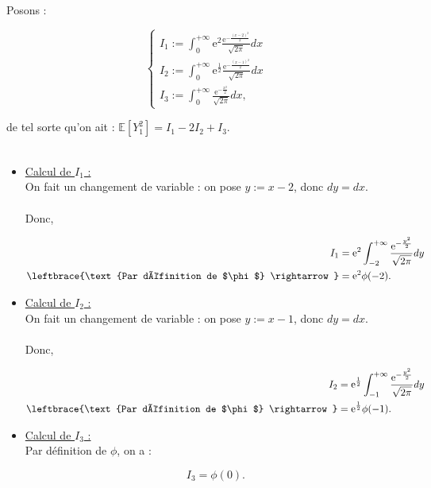 \documentclass{article}
\theoremstyle{exostyle}
\newenvironment{questions}{
\begin{enumerate}[\hspace{12pt} 1.]}{\end{enumerate}}
\begin{document}
\begin{questions}
Posons : 

\[\left\{
  \begin{array}{lll}
    I_{1} := \int_{0}^{+\infty} \text{e}^{2} \frac{ \text{e}^{-\frac{(x-2)^{2}}{2}}}{\sqrt{2\pi}}dx\\
    I_{2} := \int_{0}^{+\infty} \text{e}^{\frac{1}{2}} \frac{\text{e}^{-\frac{(x-1)^{2}}{2}}}{\sqrt{2\pi}}dx\\
    I_{3} := \int_{0}^{+\infty} \frac{\text{e}^{-\frac{x^{2}}{2}}}{\sqrt{2\pi}}dx,
\end{array}
\right.\]

de tel sorte qu'on ait : $\mathbb{E}\left[ Y_{1}^{2} \right] = I_{1}-2I_{2}+I_{3}$.\\
\\
\begin{itemize}
    \item \underline{Calcul de $I_{1}$ :}\\
    
    On fait un changement de variable : on pose $y:=x-2$, donc $dy=dx$.\\
    \\
Donc, 

\begin{align*}
    I_{1} &= \text{e}^{2} \int_{-2}^{+\infty} \frac{\text{e}^{-\frac{y^{2}}{2}}}{\sqrt{2\pi}}dy\\
    \leftbrace{\text{Par définition de $\phi$} \rightarrow} &= \text{e}^{2} \phi(-2).
\end{align*}

\item \underline{Calcul de $I_{2}$ :}\\

On fait un changement de variable : on pose $y:=x-1$, donc $dy=dx$.\\
    \\
Donc, 

\begin{align*}
    I_{2} &= \text{e}^{\frac{1}{2}} \int_{-1}^{+\infty} \frac{\text{e}^{-\frac{y^{2}}{2}}}{\sqrt{2\pi}}dy\\
    \leftbrace{\text{Par définition de $\phi$} \rightarrow} &= \text{e}^{\frac{1}{2}} \phi(-1).
\end{align*}

\item \underline{Calcul de $I_{3}$ :}\\

Par définition de $\phi$, on a : 

\[I_{3} = \phi(0).\]
\end{itemize}


\end{questions}
\end{document}
